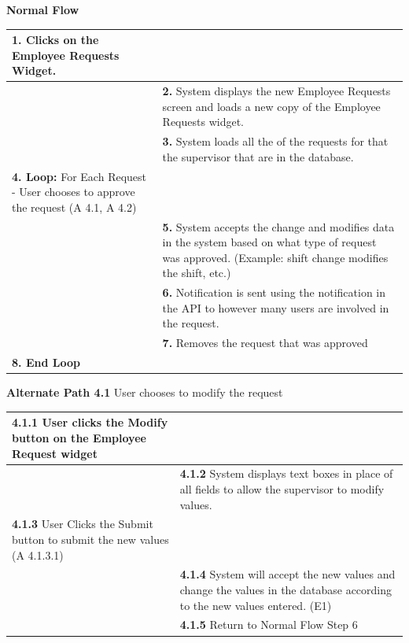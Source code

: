 \documentclass[letterpaper,12pt]{report}
\begin{document}
{ \centering \textbf{Normal Flow}
\begin{center}
\xuchead
\begin{tabular}{| p{8.5cm} | p{8.5cm} |}
\hline
\textbf{1.} Clicks on the Employee Requests Widget. & \\
\hline
& \textbf{2.} System\index{system} displays the new Employee Requests screen and loads a new copy of the Employee Requests widget. \\
\hline
& \textbf{3.} System loads all the of the requests for that the supervisor that are in the database.\index{Database} \\
\hline
\textbf{4. Loop:} For Each Request - User chooses to approve the request (A 4.1, A 4.2) & \\
\hline
& \textbf{5.} System accepts the change and modifies data in the system based on what type of request was approved. (Example: shift change modifies the shift, etc.) \\
\hline
& \textbf{6.} Notification is sent using the notification in the \index{API}API to however many users are involved in the request. \\
\hline
& \textbf{7.} Removes the request that was approved \\
\hline
\textbf{8. End Loop} & \\
\hline
\end{tabular}
\end{center}
\pagebreak
\centering \textbf{Alternate Path 4.1}
\linebreak User chooses to modify the request
\begin{center}
\xuchead
\begin{tabular}{| p{8.5cm} | p{8.5cm} |}
\hline
\textbf{4.1.1} User clicks the Modify button on the Employee Request widget & \\
\hline
& \textbf{4.1.2} System\index{system} displays text boxes in place of all fields to allow the supervisor to modify values. \\
\hline
\textbf{4.1.3} User Clicks the Submit button to submit the new values (A 4.1.3.1) & \\
\hline
& \textbf{4.1.4} System will accept the new values and change the values in the database\index{Database} according to the new values entered. (E1) \\
\hline
& \textbf{4.1.5} Return to Normal Flow Step 6 \\
\hline
\end{tabular}
\end{center}

}
\end{document}
